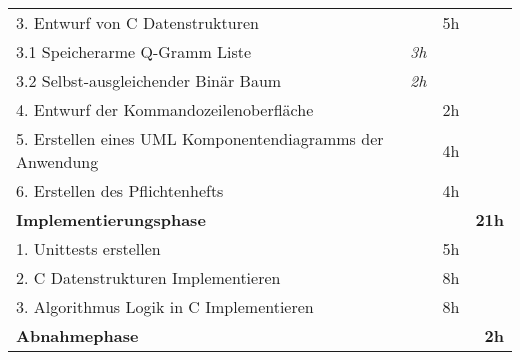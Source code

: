 \begin{table}[!htp]
\begin{tabular}{|lrrr|}
3. Entwurf von C Datenstrukturen                                   &                                  & 5h                               &                                               \\
\rowcolor[HTML]{BBDAFF}
3.1 Speicherarme Q-Gramm Liste                                     & \textit{3h}                    &                                  &                                               \\
3.2 Selbst-ausgleichender Binär Baum                               & \textit{2h}                    &                                  &                                               \\
\rowcolor[HTML]{BBDAFF}
4. Entwurf der Kommandozeilenoberfläche                            &                                  & 2h                               &                                               \\
5. Erstellen eines UML Komponentendiagramms der Anwendung          &                                  & 4h                               &                                               \\
\rowcolor[HTML]{BBDAFF}
6. Erstellen des Pflichtenhefts                                    &                                  & 4h                               &                                               \\ \hline
\rowcolor[HTML]{9698ED}
{\color[HTML]{FFFFFF} \textbf{Implementierungsphase}}            & {\color[HTML]{FFFFFF} }          & {\color[HTML]{FFFFFF} }          & {\color[HTML]{FFFFFF} \textbf{21h}}         \\ \hline
1. Unittests erstellen                                             &                                  & 5h                               &                                               \\
\rowcolor[HTML]{BBDAFF}
2. C Datenstrukturen Implementieren                                &                                  & 8h                               &                                               \\
3. Algorithmus Logik in C Implementieren                           &                                  & 8h                               &                                               \\ \hline
\rowcolor[HTML]{9698ED}
{\color[HTML]{FFFFFF} \textbf{Abnahmephase}}                     & {\color[HTML]{FFFFFF} }          & {\color[HTML]{FFFFFF} }          & {\color[HTML]{FFFFFF} \textbf{2h}}          \\ \hline

\end{tabular}
\end{table}
